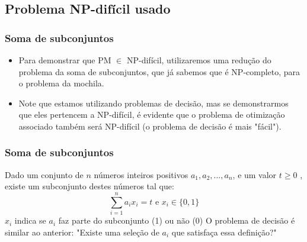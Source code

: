 \documentclass{beamer}
\begin{document}
\subsection{Problema NP-difícil usado}
\begin{frame}
    \frametitle{Soma de subconjuntos}
    \begin{itemize}
        \item
            Para demonstrar que PM $\in$ NP-difícil, utilizaremos uma redução do problema
            da soma de subconjuntos, que já sabemos que é NP-completo, para o problema da mochila.
        \item
            Note que estamos utilizando problemas de decisão, mas se demonstrarmos que
            eles pertencem a NP-difícil, é evidente que o problema de otimização associado
            também será NP-difícil (o problema de decisão é mais "fácil").
    \end{itemize}

\end{frame}

\begin{frame}
    \frametitle{Soma de subconjuntos}
        Dado um conjunto de $n$ números inteiros positivos $a_{1}, a_{2}, ..., a_{n}$, e um valor $t \geq 0$ , existe um subconjunto destes números tal que:
         \begin{equation*}
            \sum_{i=1}^{n} a_{i} x_{i} = t \mbox{ e } x_{i} \in \{0,1\}
         \end{equation*}
        $x_{i}$ indica se $a_{i}$ faz parte do subconjunto (1) ou não (0)
        \newline
        \newline
        O problema de decisão é similar ao anterior: "Existe uma seleção de $a_{i}$ que satisfaça essa definição?"
\end{frame}

\end{document}

